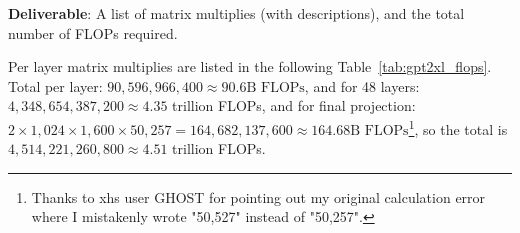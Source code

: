 \begin{enumerate}[label=(\alph*)]
    \textbf{Deliverable}: A list of matrix multiplies (with descriptions), and the total number of FLOPs required.
    
    \begin{answer}
    Per layer matrix multiplies are listed in the following Table~\ref{tab:gpt2xl_flops}. 
    Total per layer: $90,596,966,400 \approx 90.6\text{B FLOPs}$, and for 48 layers: $4,348,654,387,200 \approx 4.35$ trillion FLOPs, and for final projection: $2 \times 1,024 \times 1,600 \times 50,257 = 164,682,137,600 \approx 164.68\text{B FLOPs}$\footnote{Thanks to xhs user GHOST for pointing out my original calculation error where I mistakenly wrote "50,527" instead of "50,257".}, so the total is $4,514,221,260,800 \approx 4.51$ trillion FLOPs.
    \end{answer}

    \begin{table}[h]
    \centering
    \caption{Matrix multiplications and FLOP calculations for GPT-2 XL forward pass}
    \label{tab:gpt2xl_flops}
\end{table}
\end{enumerate}
